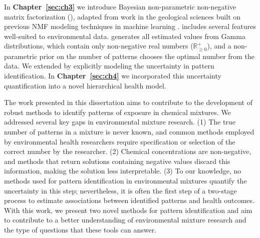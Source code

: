 In \textbf{Chapter~\ref{sec:ch3}} we introduce Bayesian non-parametric non-negative matrix factorization (\bnmfc), adapted from work in the geological sciences built on previous NMF modeling techniques in machine learning \citep{holtzman2018machine, lee1999learning, cemgil2008bayesian, paisley2014bayesian}. \bnmf includes several features well-suited to environmental data. \bnmf generates all estimated values from Gamma distributions, which contain only non-negative real numbers ($\mathbb R_{\geq 0}^+$), and a non-parametric prior on the number of patterns chooses the optimal number from the data. We extended \bnmf by explicitly modeling the uncertainty in pattern identification. In \textbf{Chapter~\ref{sec:ch4}} we incorporated this uncertainty quantification into a novel hierarchical health model. 

The work presented in this dissertation aims to contribute to the development of robust methods to identify patterns of exposure in chemical mixtures. We addressed several key gaps in environmental mixture research. (1) The true number of patterns in a mixture is never known, and common methods employed by environmental health researchers require specification or selection of the correct number by the researcher. (2) Chemical concentrations are non-negative, and methods that return solutions containing negative values discard this information, making the solution less interpretable. (3) To our knowledge, no methods used for pattern identification in environmental mixtures quantify the uncertainty in this step; nevertheless, it is  often the first step of a two-stage process to estimate associations between identified patterns and health outcomes. With this work, we present two novel methods for pattern identification and aim to contribute to a better understanding of environmental mixture research and the type of questions that these tools can answer.

\clearpage
